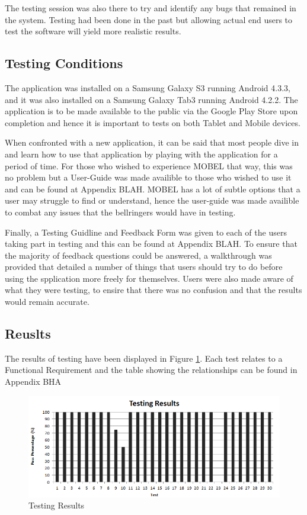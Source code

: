\documentclass{l4proj}
\begin{document}
The testing session was also there to try and identify any bugs that remained in the system.  Testing had been done in the past but allowing actual end users to test the software will yield more realistic results.

\subsection{Testing Conditions}
The application was installed on a Samsung Galaxy S3 running Android 4.3.3, and it was also installed on a Samsung Galaxy Tab3 running Android 4.2.2.  The application is to be made available to the public via the Google Play Store upon completion and hence it is important to tests on both Tablet and Mobile devices.

When confronted with a new application, it can be said that most people dive in and learn how to use that application by playing with the application for a period of time. For those who wished to experience MOBEL that way, this was no problem but a User-Guide was made availible to those who wished to use it and can be found at Appendix BLAH.  MOBEL has a lot of subtle options that a user may struggle to find or understand, hence the user-guide was made availible to combat any issues that the bellringers would have in testing.

Finally, a Testing Guidline and Feedback Form was given to each of the users taking part in testing and this can be found at Appendix BLAH.  To ensure that the majority of feedback questions could be answered, a walkthrough was provided that detailed a number of things that users should try to do before using the spplication more freely for themselves.  Users were also made aware of what they were testing, to ensire that there was no confusion and that the results would remain accurate.  
  
\subsection{Reuslts}

The results of testing have been displayed in Figure \ref{Test Results}. Each test relates to a Functional Requirement and the table showing the relationships can be found in Appendix BHA

\begin{figure}
\centering
\includegraphics[width=18cm]{testingTable.png}
\caption{Testing Results}
\label{Test Results}
\end{figure}
\end{document}
